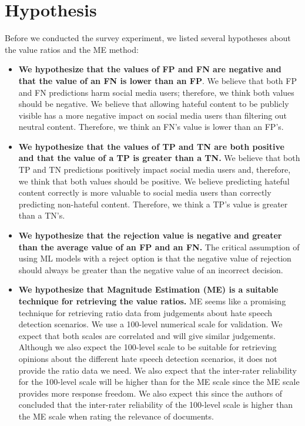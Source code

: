 \section{Hypothesis}
\label{sec:survey-hypothesis}
Before we conducted the survey experiment, we listed several hypotheses about the value ratios and the ME method:
\begin{itemize}
    \item \textbf{We hypothesize that the values of FP and FN are negative and that the value of an FN is lower than an FP}. We believe that both FP and FN predictions harm social media users; therefore, we think both values should be negative. We believe that allowing hateful content to be publicly visible has a more negative impact on social media users than filtering out neutral content. Therefore, we think an FN's value is lower than an FP's.
    \item \textbf{We hypothesize that the values of TP and TN are both positive and that the value of a TP is greater than a TN.} We believe that both TP and TN predictions positively impact social media users and, therefore, we think that both values should be positive. We believe predicting hateful content correctly is more valuable to social media users than correctly predicting non-hateful content. Therefore, we think a TP's value is greater than a TN's.
    \item \textbf{We hypothesize that the rejection value is negative and greater than the average value of an FP and an FN.} The critical assumption of using ML models with a reject option is that the negative value of rejection should always be greater than the negative value of an incorrect decision.
    \item \textbf{We hypothesize that Magnitude Estimation (ME) is a suitable technique for retrieving the value ratios.} ME seems like a promising technique for retrieving ratio data from judgements about hate speech detection scenarios. We use a 100-level numerical scale for validation. We expect that both scales are correlated and will give similar judgements. Although we also expect the 100-level scale to be suitable for retrieving opinions about the different hate speech detection scenarios, it does not provide the ratio data we need. We also expect that the inter-rater reliability for the 100-level scale will be higher than for the ME scale since the ME scale provides more response freedom. We also expect this since the authors of \citet{roitero2018fine} concluded that the inter-rater reliability of the 100-level scale is higher than the ME scale when rating the relevance of documents.
\end{itemize}

